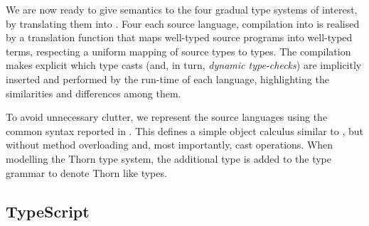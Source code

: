 \documentclass[acmlarge, anonymous, authordraft]{acmart}
\begin{document}
\noindent
We are now ready to give semantics to the four gradual type systems of interest, by translating them into \kafka. 
Four each source language, compilation into \kafka is realised by a translation function that maps well-typed source programs into well-typed \kafka terms, respecting a uniform mapping of source types to \kafka types.  The compilation makes explicit which type casts (and, in turn, \emph{dynamic type-checks}) are implicitly inserted and performed by the run-time of each language, highlighting the similarities and differences among them.   

To avoid unnecessary clutter, we represent the source languages using the common syntax reported in .  This defines a simple object calculus similar to \kafka, but without method overloading and, most importantly, cast operations.  When modelling the Thorn type system, the additional type \CW is added to the type grammar to denote Thorn like types. 



\subsection{TypeScript}
\end{document}
